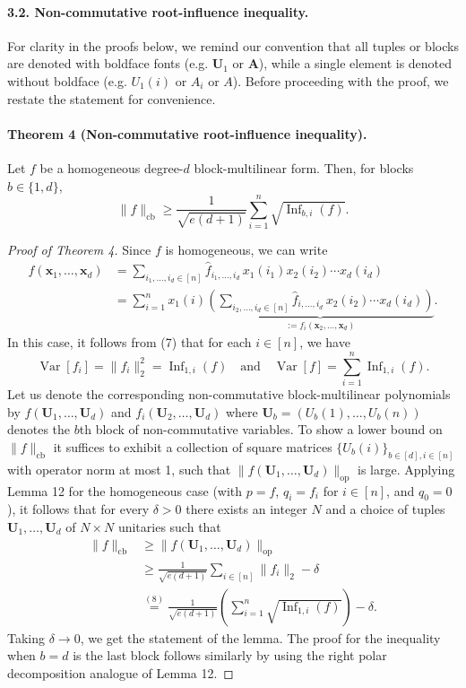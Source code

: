 \paragraph{3.2. Non-commutative root-influence inequality.}
For clarity in the proofs below, we remind our convention that all tuples or blocks are denoted with boldface fonts (e.g. $\mathbf U_1$ or $\mathbf A$), while a single element is denoted without boldface (e.g. $U_1(i)$ or $A_i$ or $A$). Before proceeding with the proof, we restate the statement for convenience.
\paragraph{Theorem 4 (Non-commutative root-influence inequality).}
Let $f$ be a homogeneous degree-$d$ block-multilinear form. Then, for blocks $b\in\{1,d\}$,
\[\|f\|_{\mathrm{cb}}\geq\frac1{\sqrt{e(d+1)}}\sum_{i=1}^n\sqrt{\operatorname{Inf}_{b,i}(f)}.\]
\begin{proof}[Proof of Theorem 4]
Since $f$ is homogeneous, we can write
\begin{align*}
f(\mathbf x_1,\ldots,\mathbf x_d)
&=\sum_{i_1,\ldots,i_d\in[n]}\widehat f_{i_1,\ldots,i_d}\,x_1(i_1)x_2(i_2)\cdots x_d(i_d)\\
&=\sum_{i=1}^nx_1(i)\underbrace{\left(\sum_{i_2,\ldots,i_d\in[n]}\widehat f_{i,\ldots,i_d}\,x_2(i_2)\cdots x_d(i_d)\right)}_{:=f_i(\mathbf x_2,\ldots,\mathbf x_d)}.
\end{align*}
In this case, it follows from (7) that for each $i\in[n]$, we have
\[\operatorname{Var}[f_i]=\|f_i\|_2^2=\operatorname{Inf}_{1,i}(f)\quad\text{and}\quad\operatorname{Var}[f]=\sum_{i=1}^n\operatorname{Inf}_{1,i}(f).\tag{8}\]
Let us denote the corresponding non-commutative block-multilinear polynomials by $f(\mathbf U_1,\ldots,\mathbf U_d)$ and $f_i(\mathbf U_2,\ldots,\mathbf U_d)$ where $\mathbf U_b=(U_b(1),\ldots,U_b(n))$ denotes the $b$th block of non-commutative variables. To show a lower bound on $\|f\|_{\mathrm{cb}}$ it suffices to exhibit a collection of square matrices $\{U_b(i)\}_{b\in[d],i\in[n]}$ with operator norm at most 1, such that $\|f(\mathbf U_1,\ldots,\mathbf U_d)\|_{\mathrm{op}}$ is large.
Applying Lemma 12 for the homogeneous case (with $p=f$, $q_i=f_i$ for $i\in[n]$, and $q_0=0$), it follows that for every $\delta>0$ there exists an integer $N$ and a choice of tuples $\mathbf U_1,\ldots,\mathbf U_d$ of $N\times N$ unitaries such that
\begin{align*}
\|f\|_{\mathrm{cb}}&\geq\|f(\mathbf U_1,\ldots,\mathbf U_d)\|_{\mathrm{op}}\\
&\geq\frac1{\sqrt{e(d+1)}}\sum_{i\in[n]}\|f_i\|_2-\delta\\
&\overset{(8)}=\frac1{\sqrt{e(d+1)}}\left(\sum_{i=1}^n\sqrt{\operatorname{Inf}_{1,i}(f)}\right)-\delta.
\end{align*}
Taking $\delta\to0$, we get the statement of the lemma. The proof for the inequality when $b=d$ is the last block follows similarly by using the right polar decomposition analogue of Lemma 12.
\end{proof}
